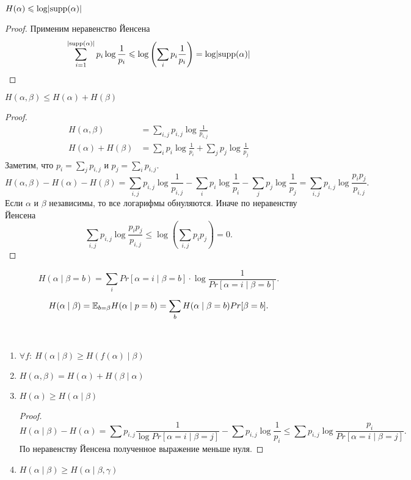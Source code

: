\begin{thm}
	$ H( \alpha ) \leqslant  \log \lvert \operatorname{supp} ( \alpha ) \rvert $
\end{thm}
\begin{proof}
	Применим неравенство Йенсена
	 \[
	\begin{aligned}
		\sum_{i = 1}^{\lvert \operatorname{supp} ( \alpha ) \rvert } p_i \log \frac{1}{p_i} \leqslant  \log \left( \sum_{i}^{} p_i \frac{1}{p_i} \right)  = \log \lvert \operatorname{supp} ( \alpha ) \rvert 
	\end{aligned}
	\]
\end{proof}
\begin{thm}
	$ H( \alpha , \beta ) \le H( \alpha ) + H ( \beta )$
\end{thm}
\begin{proof}
    \[
    \begin{aligned}
		H( \alpha , \beta ) &= \sum_{i, j}^{} p_{i, j} \log \frac{1}{p_{i, j}} \\
		H( \alpha ) + H( \beta ) &= \sum_{i}^{} p_i\log  \frac{1}{p_i} + \sum_{j}^{} p_j \log \frac{1}{p_j}
	\end{aligned}
	\]
	Заметим, что $ p_i = \sum\limits_{j}^{} p_{i, j}$ и $ p_j = \sum\limits_{i}^{} p_{i, j}$.
	\[
		H( \alpha , \beta ) -H( \alpha ) - H( \beta )= \sum_{i, j}^{} p_{i, j} \log \frac{1}{p_{i, j}}
		- \sum_{i}^{} p_i\log  \frac{1}{p_i} - \sum_{j}^{} p_j \log \frac{1}{p_j} = \sum_{i, j}^{ } p_{i, j} \log \frac{p_i p_j}{p_{i, j}}
	.\] 
	Если $  \alpha $ и $ \beta $ независимы, то все логарифмы обнуляются. Иначе по неравенству Йенсена
	\[
		\sum_{i, j}^{ } p_{i, j} \log \frac{p_i p_j}{p_{i, j}} \le  \log \left( \sum_{i, j}^{ } p_i p_j \right)  = 0
	.\] 
\end{proof}

\begin{defn}
	\[
	H( \alpha \mid \beta  = b) = \sum_{i}^{} Pr[ \alpha = i \mid  \beta  = b] \cdot  \log \frac{1}{Pr [ \alpha  = i \mid \beta  = b]}
.\]
\[
	H( \alpha  \mid \beta ) = \mathbb{E}_{b = \beta } H( \alpha  \mid p = b)  = \sum_{b}^{ } H ( \alpha  \mid \beta = b) Pr[\beta = b]
.\] 
\end{defn}
\begin{prop}
    ~\begin{enumerate}
		\item $ \forall f \colon ~ H( \alpha  \mid \beta  ) \ge  H( f( \alpha ) \mid \beta )$
		\item $ H( \alpha , \beta ) = H( \alpha ) + H( \beta  \mid \alpha )$
		\item $ H( \alpha ) \ge  H ( \alpha \mid \beta )$
			\begin{proof}
			    \[
				H( \alpha \mid \beta ) - H ( \alpha ) = \sum_{ }^{ } p_{i, j} \frac{1}{\log Pr [ \alpha  = i \mid \beta  = j]} - \sum_{ }^{ } p_{i, j} \log \frac{1}{p_i} \le  \sum_{ }^{ } p_{i, j} \log \frac{p_i}{Pr [ \alpha = i \mid \beta  = j]} 
			    .\] 
				По неравенству Йенсена полученное выражение меньше нуля.
			\end{proof}
		\item $ H( \alpha \mid \beta) \ge H( \alpha  \mid \beta, \gamma ) $
    \end{enumerate} 
\end{prop}

